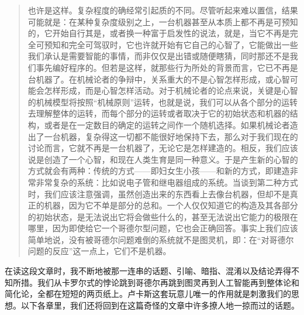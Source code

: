 \begin{quote}
也许是这样。复杂程度的确经常引起质的不同。尽管听起来难以置信，结果可能就是：在某种复杂度级别之上，一台机器甚至从本质上都不再是可预知的，它开始自行其是，或者换一种富于启发性的说法，就是，当它不再是完全可预知和完全可驾驭时，它也许就开始有它自己的心智了，它能做出一些我们承认是需要智能的事情，而非仅仅是出错或随便瞎猜，同时那还不是我们事先编好程序的。但若是这样，就那些行为所处的背景而言，它已不再是台机器了。在机械论者的争辩中，关系重大的不是心智怎样形成，或心智可能会怎样形成，而是心智怎样活动。对于机械论者的论点来说，关键是心智的机械模型将按照“机械原则”运转，也就是说，我们可以从各个部分的运转去理解整体的运转，而每个部分的运转或者取决于它的初始状态和机器的结构，或者是在一定数目的确定的运转之间作一个随机选择。如果机械论者造出了一台机器，复杂得这一切都不能很好地保持下去，那么对于我们现在的讨论而言，它就不再是一台机器了，无论它是怎样建造的。相反，我们应该说是创造了一个心智，和现在人类生育是同一种意义。于是产生新的心智的方式就会有两种：传统的方式——即妇女生小孩——和新的方式，即建造非常非常复杂的系统：比如说电子管和继电器组成的系统。当谈到第二种方式时，我们应该注意强调，虽然创造出来的东西看上去像台机器，但却不是真正的机器，因为它不单是部分的总和。一个人仅仅知道它的构造及其各部分的初始状态，是无法说出它将会做些什么的，甚至无法说出它能力的极限在哪里，因为即使给它一个哥德尔型问题，它也会正确回答。事实上我们应该简单地说，没有被哥德尔问题难倒的系统就不是图灵机，即：在“对哥德尔问题的反应”这一点上，它们不是机器。
\end{quote}

在读这段文章时，我不断地被那一连串的话题、引喻、暗指、混淆以及结论弄得不知所措。我们从卡罗尔式的悖论跳到哥德尔再跳到图灵再到人工智能再到整体论和简化论，全都在短短的两页纸上。卢卡斯这套玩意儿唯一的作用就是刺激我们的思想。以下各章里，我们还将回到在这篇奇怪的文章中许多撩人地一掠而过的话题。
